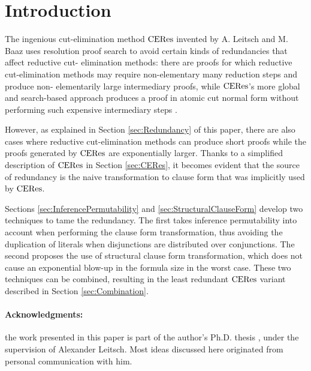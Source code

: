\section{Introduction}

The ingenious cut-elimination method $\mathrm{CERes}$ invented by A. Leitsch and M.
Baaz \cite{BaazLeitsch1999MethodsofCut-Elimination,BaazLeitsch2000Cut-
eliminationandRedundancy-eliminationbyResolution
,BaazLeitsch2006Towardsaclausalanalysisofcut-elimination} uses resolution
proof search to avoid certain kinds of redundancies that affect reductive cut-
elimination methods: there are proofs for which reductive cut-elimination
methods may require non-elementary many reduction steps and produce non-
elementarily large intermediary proofs, while $\mathrm{CERes}$'s more global and
search-based approach produces a proof in atomic cut normal form without
performing such expensive intermediary steps \cite
{BaazLeitsch2009MethodsofCut-Elimination}.

However, as explained in Section \ref{sec:Redundancy} of this paper, there are
also cases where reductive cut-elimination methods can produce short proofs
while the proofs generated by $\mathrm{CERes}$ are exponentially larger. Thanks to a
simplified description of $\mathrm{CERes}$ in Section \ref{sec:CERes}, it becomes
evident that the source of redundancy is the naive transformation to clause
form that was implicitly used by $\mathrm{CERes}$.

Sections \ref{sec:InferencePermutability} and \ref{sec:StructuralClauseForm}
develop two techniques to tame the redundancy. The first takes inference
permutability into account when performing the clause form transformation,
thus avoiding the duplication of literals when disjunctions are distributed
over conjunctions. The second proposes the use of structural clause form
transformation, which does not cause an exponential blow-up in the formula
size in the worst case. These two techniques can be combined, resulting in the
least redundant $\mathrm{CERes}$ variant described in Section \ref{sec:Combination}.

\paragraph{Acknowledgments:} the work presented in this paper is part of the
author's Ph.D. thesis \cite{Woltzenlogel-Paleo2009A-General-Analysis-of-Cut-
Elimination-by-CERes},  under the supervision of Alexander Leitsch.  Most
ideas discussed here originated from personal communication with him.
